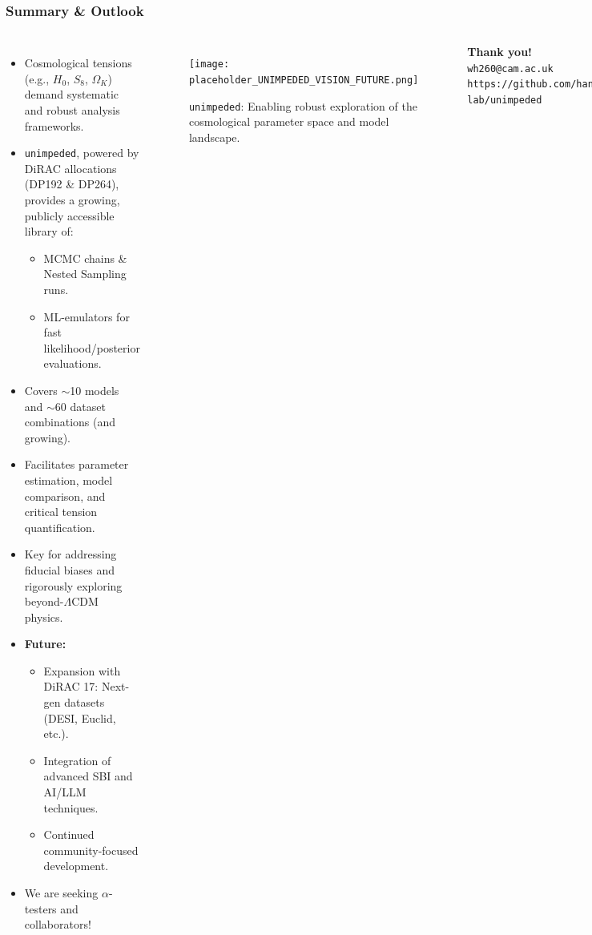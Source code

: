 \documentclass[aspectratio=169]{beamer}
\begin{document}
\begin{frame}
    \frametitle{Summary & Outlook}
    \begin{columns}[T]
        \begin{itemize}
            \item Cosmological tensions (e.g., $H_0$, $S_8$, $\Omega_K$) demand systematic and robust analysis frameworks.
            \item \texttt{unimpeded}, powered by DiRAC allocations (DP192 \& DP264), provides a growing, publicly accessible library of:
                \begin{itemize}
                    \item MCMC chains \& Nested Sampling runs.
                    \item ML-emulators for fast likelihood/posterior evaluations.
                \end{itemize}
            \item Covers $\sim$10 models and $\sim$60 dataset combinations (and growing).
            \item Facilitates parameter estimation, model comparison, and critical tension quantification.
            \item Key for addressing fiducial biases and rigorously exploring beyond-$\Lambda$CDM physics.
            \item \textbf{Future:}
                \begin{itemize}
                    \item Expansion with DiRAC 17: Next-gen datasets (DESI, Euclid, etc.).
                    \item Integration of advanced SBI and AI/LLM techniques.
                    \item Continued community-focused development.
                \end{itemize}
            \item We are seeking $\alpha$-testers and collaborators!
        \end{itemize}
        \begin{figure}
            \centering
            \texttt{[image: placeholder\_UNIMPEDED\_VISION\_FUTURE.png]}
            \caption{\texttt{unimpeded}: Enabling robust exploration of the cosmological parameter space and model landscape.}
        \end{figure}
        \vspace{1em}
        \textbf{Thank you!} \\
        \texttt{wh260@cam.ac.uk} \\
        \texttt{https://github.com/handley-lab/unimpeded}
    \end{columns}
\end{frame}
\end{document}
